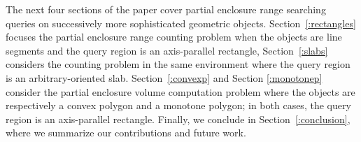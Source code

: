 \documentclass[a4paper,11pt]{article}
\begin{document}
The next four sections of the paper cover partial enclosure 
range searching queries on successively more sophisticated 
geometric objects. Section~\ref{:rectangles} focuses the 
partial enclosure range counting problem when the objects 
are line segments and the query region is an axis-parallel 
rectangle, Section~\ref{:slabs} considers the counting problem 
in the same environment where the query region is an 
arbitrary-oriented slab. Section~\ref{:convexp} and Section 
\ref{:monotonep} consider the partial enclosure volume 
computation problem where the objects are respectively 
a convex polygon and a monotone polygon; in both cases, the 
query region is an axis-parallel rectangle. Finally, we 
conclude in Section~\ref{:conclusion}, where we summarize our 
contributions and future work. 




%
%


\end{document}
